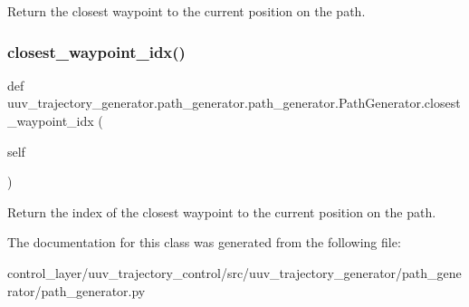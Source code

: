 \begin{DoxyVerb}Return the closest waypoint to the current position on the path.\end{DoxyVerb}
 \mbox{\label{classuuv__trajectory__generator_1_1path__generator_1_1path__generator_1_1PathGenerator_af3a4de4f82a617259d58227dd29deca9}} 
\subsubsection{\texorpdfstring{closest\+\_\+waypoint\+\_\+idx()}{closest\_waypoint\_idx()}}
{\footnotesize\ttfamily def uuv\+\_\+trajectory\+\_\+generator.\+path\+\_\+generator.\+path\+\_\+generator.\+Path\+Generator.\+closest\+\_\+waypoint\+\_\+idx (\begin{DoxyParamCaption}\item[{}]{self }\end{DoxyParamCaption})}

\begin{DoxyVerb}Return the index of the closest waypoint to the current position on the
path.
\end{DoxyVerb}
 

The documentation for this class was generated from the following file\+:\begin{DoxyCompactItemize}
\item 
control\+\_\+layer/uuv\+\_\+trajectory\+\_\+control/src/uuv\+\_\+trajectory\+\_\+generator/path\+\_\+generator/path\+\_\+generator.\+py\end{DoxyCompactItemize}
